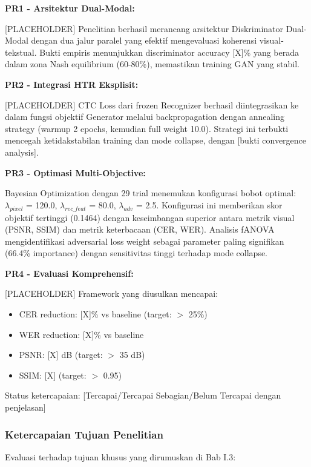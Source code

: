 \documentclass[12pt,a4paper]{article}
\begin{document}
\textbf{PR1 - Arsitektur Dual-Modal:}

[PLACEHOLDER] Penelitian berhasil merancang arsitektur Diskriminator Dual-Modal dengan dua jalur paralel yang efektif mengevaluasi koherensi visual-tekstual. Bukti empiris menunjukkan discriminator accuracy [X]\% yang berada dalam zona Nash equilibrium (60-80\%), memastikan training GAN yang stabil.

\textbf{PR2 - Integrasi HTR Eksplisit:}

[PLACEHOLDER] CTC Loss dari frozen Recognizer berhasil diintegrasikan ke dalam fungsi objektif Generator melalui backpropagation dengan annealing strategy (warmup 2 epochs, kemudian full weight 10.0). Strategi ini terbukti mencegah ketidakstabilan training dan mode collapse, dengan [bukti convergence analysis].

\textbf{PR3 - Optimasi Multi-Objective:}

Bayesian Optimization dengan 29 trial menemukan konfigurasi bobot optimal: $\lambda_{pixel}$ = 120.0, $\lambda_{rec\_feat}$ = 80.0, $\lambda_{adv}$ = 2.5. Konfigurasi ini memberikan skor objektif tertinggi (0.1464) dengan keseimbangan superior antara metrik visual (PSNR, SSIM) dan metrik keterbacaan (CER, WER). Analisis fANOVA mengidentifikasi adversarial loss weight sebagai parameter paling signifikan (66.4\% importance) dengan sensitivitas tinggi terhadap mode collapse.

\textbf{PR4 - Evaluasi Komprehensif:}

[PLACEHOLDER] Framework yang diusulkan mencapai:
\begin{itemize}[nosep]
    \item CER reduction: [X]\% vs baseline (target: $>$ 25\%)
    \item WER reduction: [X]\% vs baseline
    \item PSNR: [X] dB (target: $>$ 35 dB)
    \item SSIM: [X] (target: $>$ 0.95)
\end{itemize}

Status ketercapaian: [Tercapai/Tercapai Sebagian/Belum Tercapai dengan penjelasan]

\subsubsection{Ketercapaian Tujuan Penelitian}

Evaluasi terhadap tujuan khusus yang dirumuskan di Bab I.3:
\end{document}
